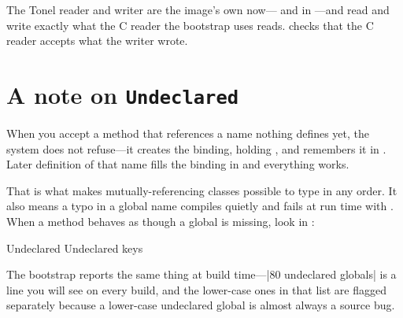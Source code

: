 \begin{stnote}
The Tonel reader and writer are the image's own now--- and
 in ---and read and write exactly what the C
reader the bootstrap uses reads.  checks that the
C reader accepts what the writer wrote.
\end{stnote}

\section{A note on \texttt{Undeclared}}

When you accept a method that references a name nothing defines yet, the
system does not refuse---it creates the binding, holding , and
remembers it in . Later definition of that name fills the
binding in and everything works.

That is what makes mutually-referencing classes possible to type in any order.
It also means a typo in a global name compiles quietly and fails at run time
with . When a method behaves as though a global is
missing, look in :

\begin{st}
Undeclared
Undeclared keys
\end{st}

The bootstrap reports the same thing at build time---\ct|80 undeclared globals| is a line you will see on every build, and the lower-case ones in
that list are flagged separately because a lower-case undeclared global is
almost always a source bug.
